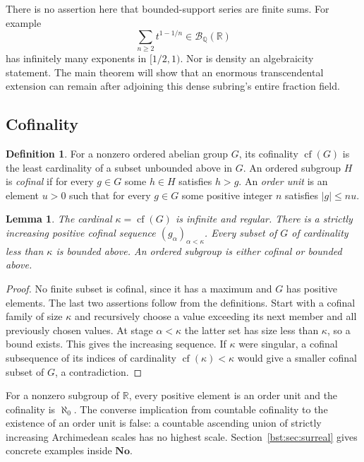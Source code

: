 \documentclass[11pt,letterpaper]{article}
\newtheorem{lemma}[theorem]{Lemma}
\theoremstyle{definition}
\newtheorem{definition}[theorem]{Definition}
\theoremstyle{remark}
\newcommand{\Q}{\mathbb Q}
\newcommand{\R}{\mathbb R}
\newcommand{\No}{\mathbf{No}}
\newcommand{\cof}{\operatorname{cf}}
\newcommand{\BB}[2]{\mathcal B_{#2}(#1)}
\newcommand{\abs}[1]{\lvert #1\rvert}
\begin{document}
There is no assertion here that bounded-support series are finite sums.
For example
\[
 \sum_{n\ge2} t^{1-1/n}\in\BB{\R}{\Q}
\]
has infinitely many exponents in $[1/2,1)$. Nor is density an algebraicity
statement. The main theorem will show that an enormous transcendental
extension can remain after adjoining this dense subring's entire fraction
field.

\subsection{Cofinality}

\begin{definition}
For a nonzero ordered abelian group $G$, its cofinality $\cof(G)$ is the least
cardinality of a subset unbounded above in $G$. An ordered subgroup $H$ is
\emph{cofinal} if for every $g\in G$ some $h\in H$ satisfies $h>g$.
An \emph{order unit} is an element $u>0$ such that for every $g\in G$ some
positive integer $n$ satisfies $\abs g\le nu$.
\end{definition}

\begin{lemma}\label{bst:lem:cofinality}
The cardinal $\kappa=\cof(G)$ is infinite and regular. There is a strictly
increasing positive cofinal sequence $(g_\alpha)_{\alpha<\kappa}$.
Every subset of $G$ of cardinality less than $\kappa$ is bounded above.
An ordered subgroup is either cofinal or bounded above.
\end{lemma}
\begin{proof}
No finite subset is cofinal, since it has a maximum and $G$ has positive
elements. The last two assertions follow from the definitions. Start with
a cofinal family of size $\kappa$ and recursively choose a value exceeding
its next member and all previously chosen values. At stage $\alpha<\kappa$
the latter set has size less than $\kappa$, so a bound exists. This gives
the increasing sequence. If $\kappa$ were singular, a cofinal subsequence
of its indices of cardinality $\cof(\kappa)<\kappa$ would give a smaller
cofinal subset of $G$, a contradiction.
\end{proof}

For a nonzero subgroup of $\R$, every positive element is an order unit and
the cofinality is $\aleph_0$. The converse implication from countable
cofinality to the existence of an order unit is false: a countable ascending
union of strictly increasing Archimedean scales has no highest scale.
Section~\ref{bst:sec:surreal} gives concrete examples inside $\No$.
\end{document}

